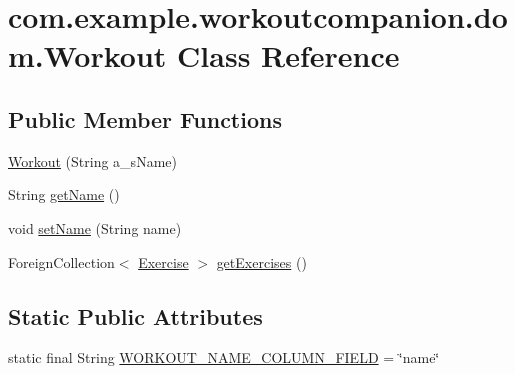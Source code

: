 \hypertarget{classcom_1_1example_1_1workoutcompanion_1_1dom_1_1_workout}{\section{com.\-example.\-workoutcompanion.\-dom.\-Workout Class Reference}
\label{classcom_1_1example_1_1workoutcompanion_1_1dom_1_1_workout}
}
\subsection*{Public Member Functions}
\begin{DoxyCompactItemize}
\item 
\hyperlink{classcom_1_1example_1_1workoutcompanion_1_1dom_1_1_workout_a659d9313e861a95d04075615f383e564}{Workout} (String a\-\_\-s\-Name)
\item 
String \hyperlink{classcom_1_1example_1_1workoutcompanion_1_1dom_1_1_workout_adda3e121b7c0ecf1fa80c272dc5218aa}{get\-Name} ()
\item 
void \hyperlink{classcom_1_1example_1_1workoutcompanion_1_1dom_1_1_workout_a11e053688dec0a5a527c885610338b1b}{set\-Name} (String name)
\item 
Foreign\-Collection$<$ \hyperlink{classcom_1_1example_1_1workoutcompanion_1_1dom_1_1_exercise}{Exercise} $>$ \hyperlink{classcom_1_1example_1_1workoutcompanion_1_1dom_1_1_workout_ac9c0c14bad6cbd7a6d18c753bddd6c50}{get\-Exercises} ()
\end{DoxyCompactItemize}
\subsection*{Static Public Attributes}
\begin{DoxyCompactItemize}
\item 
static final String \hyperlink{classcom_1_1example_1_1workoutcompanion_1_1dom_1_1_workout_a18f5c457f9aa5822f652f8a920f2ac9a}{W\-O\-R\-K\-O\-U\-T\-\_\-\-N\-A\-M\-E\-\_\-\-C\-O\-L\-U\-M\-N\-\_\-\-F\-I\-E\-L\-D} = \char`\"{}name\char`\"{}
\end{DoxyCompactItemize}


